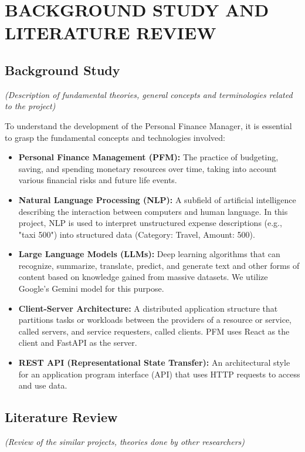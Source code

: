 \chapter{BACKGROUND STUDY AND LITERATURE REVIEW}

\section{Background Study}
\textit{(Description of fundamental theories, general concepts and terminologies related to the project)}

To understand the development of the Personal Finance Manager, it is essential to grasp the fundamental concepts and technologies involved:

\begin{itemize}
    \item \textbf{Personal Finance Management (PFM):} The practice of budgeting, saving, and spending monetary resources over time, taking into account various financial risks and future life events.
    \item \textbf{Natural Language Processing (NLP):} A subfield of artificial intelligence describing the interaction between computers and human language. In this project, NLP is used to interpret unstructured expense descriptions (e.g., "taxi 500") into structured data (Category: Travel, Amount: 500).
    \item \textbf{Large Language Models (LLMs):} Deep learning algorithms that can recognize, summarize, translate, predict, and generate text and other forms of content based on knowledge gained from massive datasets. We utilize Google's Gemini model for this purpose.
    \item \textbf{Client-Server Architecture:} A distributed application structure that partitions tasks or workloads between the providers of a resource or service, called servers, and service requesters, called clients. PFM uses React as the client and FastAPI as the server.
    \item \textbf{REST API (Representational State Transfer):} An architectural style for an application program interface (API) that uses HTTP requests to access and use data.
\end{itemize}

\section{Literature Review}
\textit{(Review of the similar projects, theories done by other researchers)}

